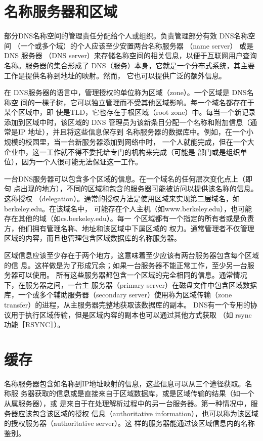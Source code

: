 \section{名称服务器和区域}

部分DNS名称空间的管理责任分配给个人或组织。负责管理部分有效 DNS名称空间
（一个或多个域）的个人应该至少安置两台名称服务器 （name server） 或是 DNS 服务器 （DNS
server）来存储名称空间的相关信息，以便于互联网用户查询名称。服务器的集合形成了
DNS（服务）本身，它就是一个分布式系统，其主要工作是提供名称到地址的映射。然而，
它也可以提供广泛的额外信息。

在 DNS服务器的语言中，管理授权的单位称为区域（zone）。一个区域是 DNS名称空
间的一棵子树，它可以独立管理而不受其他区域影响。每一个域名都存在于某个区域中，即
使是TLD，它也存在于根区域（root zone）中。每当一个新记录添加到区域中时，该区域的
DNS 管理员为该新条目分配一个名称和附加信息（通常是IP 地址），并且将这些信息保存到
名称服务器的数据库中。例如，在一个小规模的校园里，当一台新服务器添加到网络中时，
一个人就能完成，但在一个大企业中，这一工作就不得不委托给专门的机构来完成（可能是
部门或是组织单位），因为一个人很可能无法保证这一工作。

一台DNS服务器可以包含多个区域的信息。在一个域名的任何层次变化点上（即句
点出现的地方），不同的区域和包含的服务器可能被访问以提供该名称的信息。这称授权
（delegation）。通常的授权方法是使用区域来实现第二层域名，如berkeley.edu。在该域名中，
可能存在个人主机（如www.berkeley.edu），也可能存在其他的域（如cs.berkeley.edu）。每一
个区域都有一个指定的所有者或是负责方，他们拥有管理名称、地址和该区域中下属区域的
权力。通常管理者不仅管理区域的内容，而且也管理包含区域数据库的名称服务器。

区域信息应该至少存在于两个地方，这意味着至少应该有两台服务器包含每个区域的信
息。这样做是为了形成冗余；如果一台服务器不能正常工作，至少另一台服务器可以使用。
所有这些服务器都包含一个区域的完全相同的信息。通常情况下，在服务器之间，一台主
服务器（primary server）在磁盘文件中包含区域数据库，一个或多个辅助服务器（secondary
server）使用称为区域传输（zone transfer）的进程，从主服务器完整地获取该数据库的副本。
DNS有一个专用的协议用于执行区域传输，但是区域内容的副本也可以通过其他方式获取
（如 rsync 功能［RSYNC］）。

\section{缓存}

名称服务器包含如名称到IP地址映射的信息，这些信息可以从三个途径获取。名称服
务器获取的信息或是直接来自于区域数据库，或是区域传输的结果（如一个从属服务器），或
是来自于在处理解析过程中的另一台服务器。第一种情况中，服务器应该包含该区域的授权
信息（authoritative information），也可以称为该区域的授权服务器（authoritative server）。这
样的服务器能通过该区域信息内的名称鉴别。

